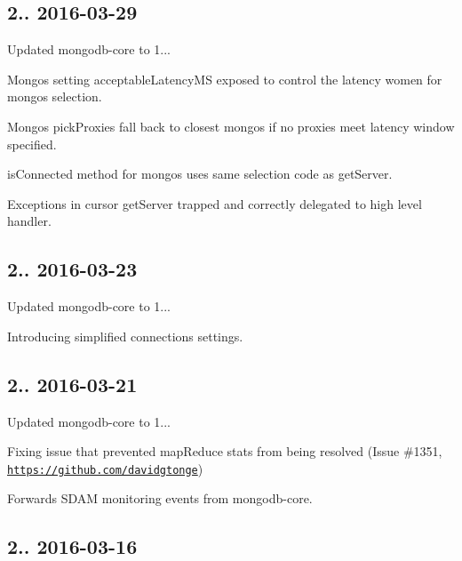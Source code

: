 \subsection*{2.. 2016-\/03-\/29 }


\begin{DoxyItemize}
\item Updated mongodb-\/core to 1...
\item Mongos setting acceptable\+Latency\+MS exposed to control the latency women for mongos selection.
\item Mongos pick\+Proxies fall back to closest mongos if no proxies meet latency window specified.
\item is\+Connected method for mongos uses same selection code as get\+Server.
\item Exceptions in cursor get\+Server trapped and correctly delegated to high level handler.
\end{DoxyItemize}

\subsection*{2.. 2016-\/03-\/23 }


\begin{DoxyItemize}
\item Updated mongodb-\/core to 1...
\item Introducing simplified connections settings.
\end{DoxyItemize}

\subsection*{2.. 2016-\/03-\/21 }


\begin{DoxyItemize}
\item Updated mongodb-\/core to 1...
\item Fixing issue that prevented map\+Reduce stats from being resolved (Issue \#1351, \href{https://github.com/davidgtonge}{\tt https\+://github.\+com/davidgtonge})
\item Forwards S\+D\+AM monitoring events from mongodb-\/core.
\end{DoxyItemize}

\subsection*{2.. 2016-\/03-\/16 }


